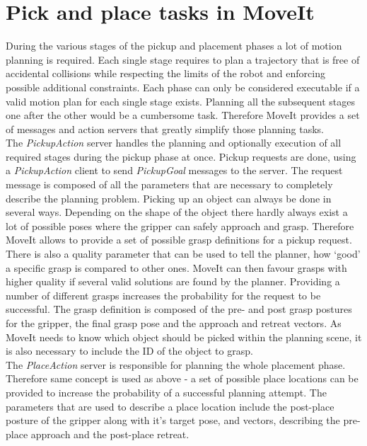 \section{Pick and place tasks in MoveIt}

During the various stages of the pickup and placement phases a lot of motion planning is required. Each single stage requires to plan a trajectory that is free of accidental collisions while respecting the limits of the robot and enforcing possible additional constraints. Each phase can only be considered executable if a valid motion plan for each single stage exists. Planning all the subsequent stages one after the other would be a cumbersome task. Therefore MoveIt provides a set of messages and action servers that greatly simplify those planning tasks.\\

The \emph{PickupAction} server handles the planning and optionally execution of all required stages during the pickup phase at once. Pickup requests are done, using a \emph{PickupAction} client to send \emph{PickupGoal} messages to the server. The request message is composed of all the parameters that are necessary to completely describe the planning problem. Picking up an object can always be done in several ways. Depending on the shape of the object there hardly always exist a lot of possible poses where the gripper can safely approach and grasp. Therefore MoveIt allows to provide a set of possible grasp definitions for a pickup request. There is also a quality parameter that can be used to tell the planner, how `good' a specific grasp is compared to other ones. MoveIt can then favour grasps with higher quality if several valid solutions are found by the planner. Providing a number of different grasps increases the probability for the request to be successful. The grasp definition is composed of the pre- and post grasp postures for the gripper, the final grasp pose and the approach and retreat vectors. As MoveIt needs to know which object should be picked within the planning scene, it is also necessary to include the ID of the object to grasp.\\

The \emph{PlaceAction} server is responsible for planning the whole placement phase. Therefore same concept is used as above - a set of possible place locations can be provided to increase the probability of a successful planning attempt. The parameters that are used to describe a place location include the post-place posture of the gripper along with it's target pose, and vectors, describing the pre-place approach and the post-place retreat.\\

